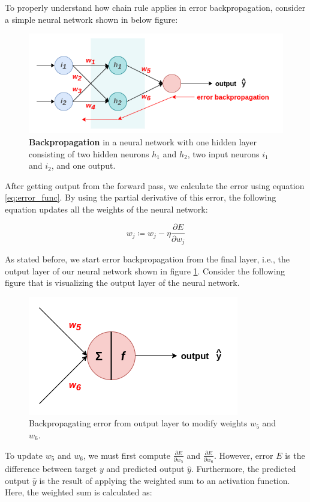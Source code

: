 To properly understand how chain rule applies in error backpropagation, consider a simple neural network shown in below figure:

\begin{figure}[h]
	\centering
	\includegraphics[width=0.7\linewidth]{images/background/back_prop.png}
	\caption[Backpropagation in a neural network]%
	{\textbf{Backpropagation} in a neural network with one hidden layer consisting of two hidden neurons $h_1$ and $h_2$, two input neurons $i_1$ and $i_2$, and one output.}
	\label{fig:back_prop}
\end{figure}

After getting output from the forward pass, we calculate the error using equation \ref{eq:error_func}. By using the partial derivative of this error, the following equation updates all the weights of the neural network:

\begin{equation}
    \label{eq:backprop_wu}
    w_j \coloneqq w_j - \eta \frac{\partial E}{\partial w_j}
\end{equation}

As stated before, we start error backpropagation from the final layer, i.e., the output layer of our neural network shown in figure \ref{fig:back_prop}. Consider the following figure that is visualizing the output layer of the neural network.

\begin{figure}[h]
	\centering
	\includegraphics[width=0.4\linewidth]{images/background/back_prop_1.png}
	\caption[Backpropagating error from output layer]%
	{Backpropagating error from output layer to modify weights $w_5$ and $w_6$.}
	\label{fig:back_prop_1}
\end{figure}

To update $w_5$ and $w_6$, we must first compute $\frac{\partial E}{\partial w_5}$ and $\frac{\partial E}{\partial w_6}$. However, error $E$ is the difference between target $y$ and predicted output $\hat{y}$. Furthermore, the predicted output $\hat{y}$ is the result of applying the weighted sum to an activation function. Here, the weighted sum is calculated as:

